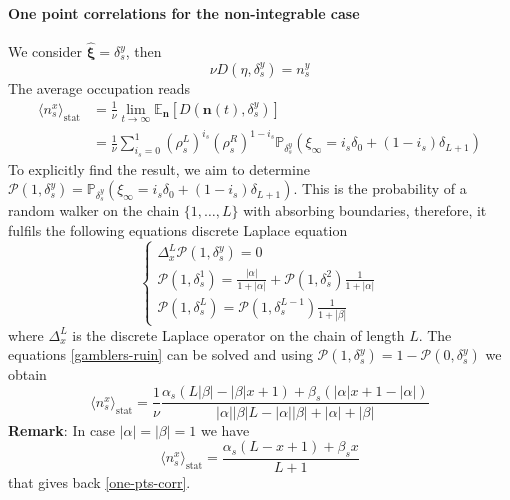 \documentclass[10pt]{article}
\numberwithin{equation}{section}
\numberwithin{equation}{subsection}
\begin{document}
\paragraph{One point correlations for the non-integrable case}
We consider $\widehat{\bm{\xi}}=\delta_{s}^{y}$, then 
\begin{equation}
	\nu D(\eta,\delta_{s}^{y})=n_{s}^{y}
\end{equation}
The average occupation reads
\begin{equation}\label{OnePtsCORR}
	\begin{split}
		\langle n_{s}^{x}\rangle_{\text{stat}}&=\frac{1}{\nu}\lim_{t\to\infty}\mathbb{E}_{\bm{n}}\left[D(\bm{n}(t),\delta_{s}^{y})\right]\\&=\frac{1}{\nu}\sum_{i_{s}=0}^{1}\left(\rho_{s}^{L}\right)^{i_{s}}\left(\rho_{s}^{R}\right)^{1-i_{s}}\mathbb{P}_{\delta_{s}^{y}}\left(\xi_{\infty}=i_{s}\delta_{0}+(1-i_{s})\delta_{L+1}\right)
	\end{split}
\end{equation}
To explicitly find the result, we aim to determine $\mathcal{P}(1,\delta_{s}^{y})=\mathbb{P}_{\delta_{s}^{y}}\left(\xi_{\infty}=i_{s}\delta_{0}+(1-i_{s})\delta_{L+1}\right)$. This is the probability of a random walker on the chain $\{1,\ldots,L\}$ with absorbing boundaries, therefore, it fulfils the following equations discrete Laplace equation
\begin{equation}\label{gamblers-ruin}
	\begin{cases}
		\Delta_{x}^{L}\mathcal{P}(1,\delta_{s}^{y})=0\\
		\mathcal{P}(1,\delta_{s}^{1})=\frac{|\alpha|}{1+|\alpha|}+\mathcal{P}(1,\delta_{s}^{2})\frac{1}{1+|\alpha|}\\
	\mathcal{P}(1,\delta_{s}^{L})=\mathcal{P}(1,\delta_{s}^{L-1})\frac{1}{1+|\beta|}
	\end{cases}
\end{equation}
where $\Delta_{x}^{L}$ is the discrete Laplace operator on the chain of length $L$. The equations \eqref{gamblers-ruin} can be solved and using $\mathcal{P}(1,\delta_{s}^{y})=1-\mathcal{P}(0,\delta_{s}^{y})$ we obtain 
\begin{equation}
	\langle n_{s}^{x}\rangle_{\text{stat}}=\frac{1}{\nu}\frac{\alpha_{s}(L|\beta|-|\beta|x+1)+\beta_{s}(|\alpha|x+1-|\alpha|)}{|\alpha||\beta|L-|\alpha||\beta|+|\alpha|+|\beta|}
\end{equation}
\textbf{Remark}: In case $|\alpha|=|\beta|=1$ we have 
\begin{equation}
	\langle n_{s}^{x}\rangle_{\text{stat}}=\frac{\alpha_{s}(L-x+1)+\beta_{s}x}{L+1}
\end{equation}
that gives back \eqref{one-pts-corr}.
\end{document}
